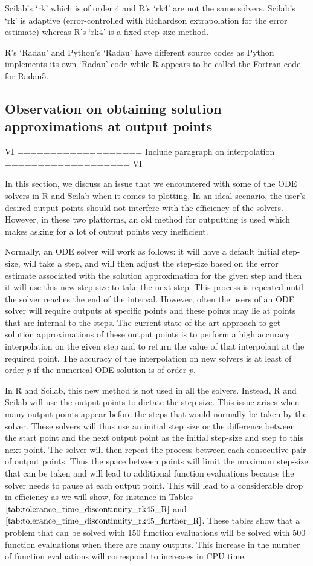 Scilab's `rk' which is of order 4 and R's `rk4' are not the same solvers. Scilab's `rk' is adaptive (error-controlled with Richardson extrapolation for the error estimate) whereas R's `rk4' is a fixed step-size method.

R's `Radau' and Python's `Radau' have different source codes as Python implements its own `Radau' code while R appears to be called the Fortran code for Radau5.

\subsection{Observation on obtaining solution approximations at output points}
\label{subsection:solution_output_points_impl}
VI ===================
Include paragraph on interpolation
=================== VI

In this section, we discuss an issue that we encountered with some of the ODE solvers in R and Scilab when it comes to plotting. In an ideal scenario, the user's desired output points should not interfere with the efficiency of the solvers. However, in these two platforms, an old method for outputting is used which makes asking for a lot of output points very inefficient.

Normally, an ODE solver will work as follows: it will have a default initial step-size, will take a step, and will then adjust the step-size based on the error estimate associated with the solution approximation for the given step and then it will use this new step-size to take the next step. This process is repeated until the solver reaches the end of the interval. However, often the users of an ODE solver will require outputs at specific points and these points may lie at points that are internal to the steps. The current state-of-the-art approach to get solution approximations of these output points is to perform a high accuracy interpolation on the given step and to return the value of that interpolant at the required point. The accuracy of the interpolation on new solvers is at least of order $p$ if the numerical ODE solution is of order $p$.

In R and Scilab, this new method is not used in all the solvers. Instead, R and Scilab will use the output points to dictate the step-size. This issue arises when many output points appear before the steps that would normally be taken by the solver. These solvers will thus use an initial step size or the difference between the start point and the next output point as the initial step-size and step to this next point. The solver will then repeat the process between each consecutive pair of output points. Thus the space between points will limit the maximum step-size that can be taken and will lead to additional function evaluations because the solver needs to pause at each output point. This will lead to a considerable drop in efficiency as we will show, for instance in Tables $\ref{tab:tolerance_time_discontinuity_rk45_R}$ and $\ref{tab:tolerance_time_discontinuity_rk45_further_R}$. These tables show that a problem that can be solved with 150 function evaluations will be solved with 500 function evaluations when there are many outputs. This increase in the number of function evaluations will correspond to increases in CPU time. 

